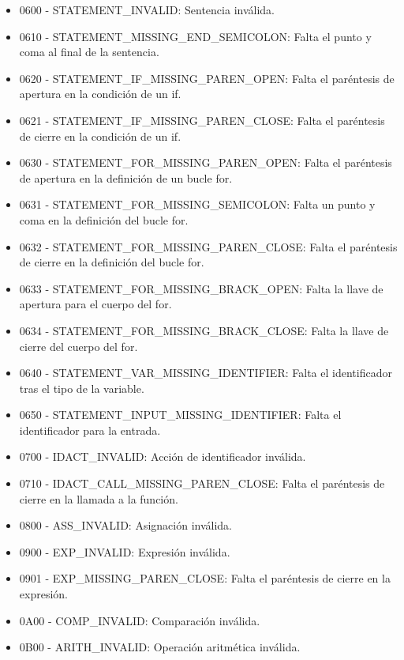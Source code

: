 \begin{itemize}
    \item 0600 - STATEMENT\_INVALID: Sentencia inválida.
    \item 0610 - STATEMENT\_MISSING\_END\_SEMICOLON: Falta el punto y coma al final de la sentencia.
    \item 0620 - STATEMENT\_IF\_MISSING\_PAREN\_OPEN: Falta el paréntesis de apertura en la condición de un if.
    \item 0621 - STATEMENT\_IF\_MISSING\_PAREN\_CLOSE: Falta el paréntesis de cierre en la condición de un if.
    \item 0630 - STATEMENT\_FOR\_MISSING\_PAREN\_OPEN: Falta el paréntesis de apertura en la definición de un bucle for.
    \item 0631 - STATEMENT\_FOR\_MISSING\_SEMICOLON: Falta un punto y coma en la definición del bucle for.
    \item 0632 - STATEMENT\_FOR\_MISSING\_PAREN\_CLOSE: Falta el paréntesis de cierre en la definición del bucle for.
    \item 0633 - STATEMENT\_FOR\_MISSING\_BRACK\_OPEN: Falta la llave de apertura para el cuerpo del for.
    \item 0634 - STATEMENT\_FOR\_MISSING\_BRACK\_CLOSE: Falta la llave de cierre del cuerpo del for.
    \item 0640 - STATEMENT\_VAR\_MISSING\_IDENTIFIER: Falta el identificador tras el tipo de la variable.
    \item 0650 - STATEMENT\_INPUT\_MISSING\_IDENTIFIER: Falta el identificador para la entrada.

    \item 0700 - IDACT\_INVALID: Acción de identificador inválida.
    \item 0710 - IDACT\_CALL\_MISSING\_PAREN\_CLOSE: Falta el paréntesis de cierre en la llamada a la función.

    \item 0800 - ASS\_INVALID: Asignación inválida.

    \item 0900 - EXP\_INVALID: Expresión inválida.
    \item 0901 - EXP\_MISSING\_PAREN\_CLOSE: Falta el paréntesis de cierre en la expresión.

    \item 0A00 - COMP\_INVALID: Comparación inválida.

    \item 0B00 - ARITH\_INVALID: Operación aritmética inválida.
\end{itemize}
